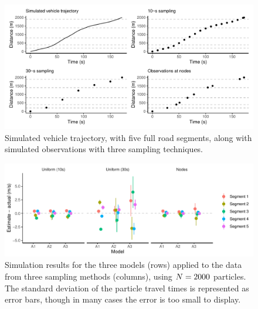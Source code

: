 \begin{knitrout}\small
{}\color{fgcolor}\begin{figure}
\includegraphics[width=\linewidth]{figure/sim1_graph-1} \caption[Simulated vehicle trajectory, with five full road segments, along with simulated observations with three sampling techniques]{Simulated vehicle trajectory, with five full road segments, along with simulated observations with three sampling techniques.}\label{fig:sim1_graph}
\end{figure}


\end{knitrout}

\begin{knitrout}\small
{}\color{fgcolor}\begin{figure}
\includegraphics[width=\linewidth]{figure/sim1_pf-1} \caption[Simulation results for the three models (rows) applied to the data from three sampling methods (columns), using $\Np=2000$ particles]{Simulation results for the three models (rows) applied to the data from three sampling methods (columns), using $\Np=2000$ particles. The standard deviation of the particle travel times is represented as error bars, though in many cases the error is too small to display.}\label{fig:sim1_pf}
\end{figure}


\end{knitrout}

